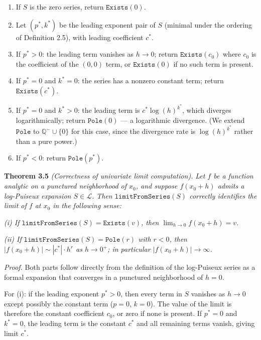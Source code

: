 \documentclass[12pt]{article}
\providecommand{\tightlist}{\setlength{\itemsep}{0pt}\setlength{\parskip}{0pt}}
\begin{document}
\begin{enumerate}
\def\labelenumi{\arabic{enumi}.}
\tightlist
\item
  If \(S\) is the zero series, return \(\mathtt{Exists}(0)\).
\item
  Let \((p^*, k^*)\) be the leading exponent pair of \(S\) (minimal
  under the ordering of Definition 2.5), with leading coefficient
  \(c^*\).
\item
  If \(p^* > 0\): the leading term vanishes as \(h \to 0\); return
  \(\mathtt{Exists}(c_0)\) where \(c_0\) is the coefficient of the
  \((0,0)\) term, or \(\mathtt{Exists}(0)\) if no such term is present.
\item
  If \(p^* = 0\) and \(k^* = 0\): the series has a nonzero constant
  term; return \(\mathtt{Exists}(c^*)\).
\item
  If \(p^* = 0\) and \(k^* > 0\): the leading term is
  \(c^* \log(h)^{k^*}\), which diverges logarithmically; return
  \(\mathtt{Pole}(0)\) --- a logarithmic divergence. (We extend
  \(\mathtt{Pole}\) to \(\mathbb{Q}^- \cup \{0\}\) for this case, since
  the divergence rate is \(\log(h)^{k^*}\) rather than a pure power.)
\item
  If \(p^* < 0\): return \(\mathtt{Pole}(p^*)\).
\end{enumerate}

\textbf{Theorem 3.5} \emph{(Correctness of univariate limit
computation).} \emph{Let \(f\) be a function analytic on a punctured
neighborhood of \(x_0\), and suppose \(f(x_0 + h)\) admits a log-Puiseux
expansion \(S \in \mathcal{L}\). Then \(\mathtt{limitFromSeries}(S)\)
correctly identifies the limit of \(f\) at \(x_0\) in the following
sense:}

\emph{(i) If \(\mathtt{limitFromSeries}(S) = \mathtt{Exists}(v)\), then
\(\lim_{h \to 0} f(x_0 + h) = v\).}

\emph{(ii) If \(\mathtt{limitFromSeries}(S) = \mathtt{Pole}(r)\) with
\(r < 0\), then \(|f(x_0 + h)| \sim |c^*| \cdot h^r\) as \(h \to 0^+\);
in particular \(|f(x_0 + h)| \to \infty\).}

\emph{Proof.} Both parts follow directly from the definition of the
log-Puiseux series as a formal expansion that converges in a punctured
neighborhood of \(h = 0\).

For (i): if the leading exponent \(p^* > 0\), then every term in \(S\)
vanishes as \(h \to 0\) except possibly the constant term (\(p = 0\),
\(k = 0\)). The value of the limit is therefore the constant coefficient
\(c_0\), or zero if none is present. If \(p^* = 0\) and \(k^* = 0\), the
leading term is the constant \(c^*\) and all remaining terms vanish,
giving limit \(c^*\).
\end{document}
